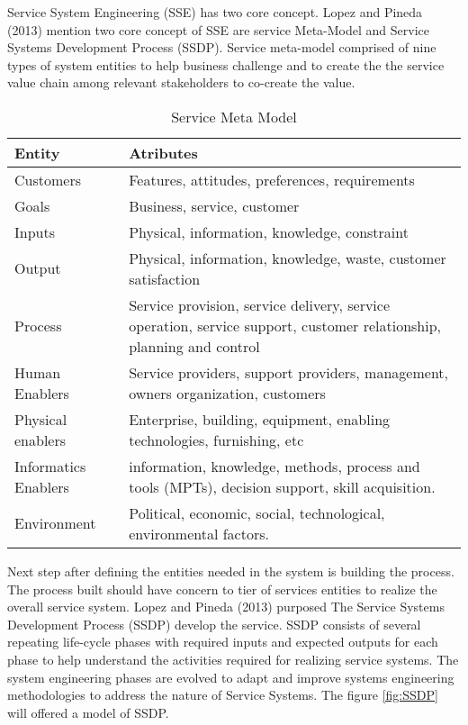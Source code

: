 Service System Engineering (SSE) has two core concept. Lopez and Pineda (2013) mention two core concept of SSE are service Meta-Model and Service Systems Development Process (SSDP). Service meta-model comprised of nine types of system entities to help business challenge and to create the the service value chain among relevant stakeholders to co-create the value.\par
\begin{table}[H] 
\begin{center}
\caption{Service Meta Model}
\label{tab: TabelServiceMeta}
	\vspace{0.1cm}
\begin{tabular}{ |p{3cm}|p{9cm}| }
 \hline
 \textbf{Entity} & \textbf{Atributes}\\
 \hline \hline
 Customers & Features, attitudes, preferences, requirements \\
 \hline 
 Goals & Business, service, customer\\
 \hline
 Inputs & Physical, information, knowledge, constraint\\
 \hline
 Output & Physical, information, knowledge, waste, customer satisfaction\\
 \hline
 Process & Service provision, service delivery, service operation, service support, customer relationship, planning and control\\
 \hline
 Human Enablers & Service providers, support providers, management, owners organization, customers\\
 \hline
 Physical enablers & Enterprise, building, equipment, enabling technologies, furnishing, etc\\
 \hline
 Informatics Enablers & information, knowledge, methods, process and tools (MPTs), decision support, skill acquisition. \\
 \hline
 Environment &Political, economic, social, technological, environmental factors.\\ 
 \hline
\end{tabular}
\end{center}
\end{table}\par

Next step after defining the entities needed in the system is building the process. The process built should have concern to tier of services entities to realize the overall service system. Lopez and Pineda (2013) purposed The Service Systems Development Process (SSDP) develop the service. SSDP consists of several repeating life-cycle phases with required inputs and expected outputs for each phase to help understand the activities required for realizing service systems. The system engineering phases are evolved to adapt and improve systems engineering methodologies to address the nature of Service Systems. The figure \ref{fig:SSDP} will offered a model of SSDP.\par

